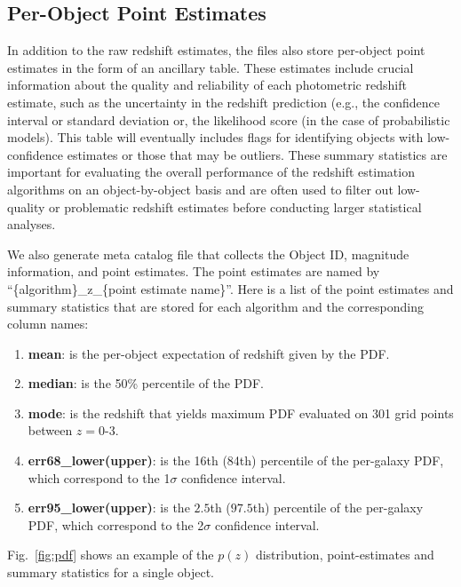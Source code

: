 \subsection{Per-Object Point Estimates}
\label{sec:products:summary_statistics}

In addition to the raw redshift estimates, the  files also store per-object point estimates in the form of an ancillary table.  These estimates include crucial information about the quality and reliability of each photometric redshift estimate, such as the uncertainty in the redshift prediction (e.g., the confidence interval or standard deviation or, the likelihood score (in the case of probabilistic models).   This table will eventually includes flags for identifying objects with low-confidence estimates or those that may be outliers.  These summary statistics are important for evaluating the overall performance of the redshift estimation algorithms on an object-by-object basis and are often used to filter out low-quality or problematic redshift estimates before conducting larger statistical analyses.


We also generate meta catalog file that collects the Object ID, magnitude information, and point estimates. The point estimates are named by ``\{algorithm\}\_z\_\{point estimate name\}''.
Here is a list of the point estimates and summary statistics that are stored for each algorithm and the corresponding column names:
\begin{enumerate}
    \item \textbf{mean}: is the per-object expectation of redshift given by the PDF. 
    \item \textbf{median}: is the 50\% percentile of the PDF.
    \item \textbf{mode}: is the redshift that yields maximum PDF evaluated on 301 grid points between $z=0$-$3$. 
    \item \textbf{err68\_lower(upper)}: is the 16th (84th) percentile of the per-galaxy PDF, which correspond to the 1$\sigma$ confidence interval. 
    \item \textbf{err95\_lower(upper)}: is the $2.5$th ($97.5$th) percentile of the per-galaxy PDF, which correspond to the 2$\sigma$ confidence interval. 
\end{enumerate}
Fig.~\ref{fig:pdf} shows an example of the $p(z)$ distribution, point-estimates and summary statistics for a single object.

